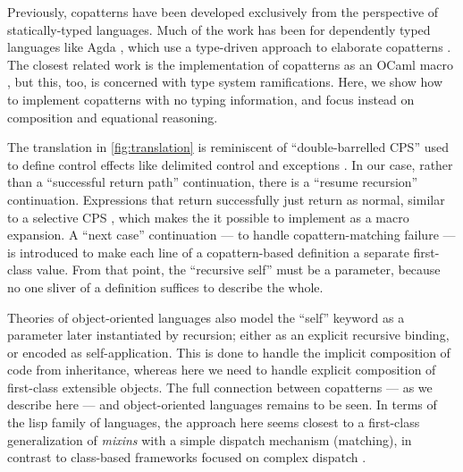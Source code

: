 Previously, copatterns have been developed exclusively from the perspective of statically-typed languages.
Much of the work has been for dependently typed languages like Agda \cite{ElaboratingDependentCopatterns}, which use a type-driven approach to elaborate copatterns \cite{UnnestingCopatterns,ThibodeauMasters}.
The closest related work is the implementation of copatterns as an OCaml macro \cite{LaforgueR17}, but this, too, is concerned with type system ramifications.
Here, we show how to implement copatterns with no typing information, and focus instead on composition and equational reasoning.

The translation in \cref{fig:translation} is reminiscent of ``double-barrelled CPS'' \cite{DoubleBarrelCPS} used to define control effects like delimited control \cite{AbstractingControl} and exceptions \cite{KimYiDanvy98}.
In our case, rather than a ``successful return path'' continuation, there is a ``resume recursion'' continuation.
Expressions that return successfully just return as normal, similar to a selective CPS \cite{SelectiveCPS}, which makes the it possible to implement as a macro expansion.
A ``next case'' continuation --- to handle copattern-matching failure --- is introduced to make each line of a copattern-based definition a separate first-class value.
From that point, the ``recursive self'' must be a parameter, because no one sliver of a definition suffices to describe the whole.

Theories of object-oriented languages \cite{abadi96,CookP94} also model the ``self'' keyword as a parameter later instantiated by recursion; either as an explicit recursive binding, or encoded as self-application.
This is done to handle the implicit composition of code from inheritance, whereas here we need to handle explicit composition of first-class extensible objects.
The full connection between copatterns --- as we describe here --- and object-oriented languages remains to be seen.
In terms of the lisp family of languages, the approach here seems closest to a first-class generalization of \emph{mixins} \cite{BrachaC90Mixins,flatt1998mixin} with a simple dispatch mechanism (matching), in contrast to class-based frameworks focused on complex dispatch \cite{CLOS,Ingalls86,chambers1992}.


